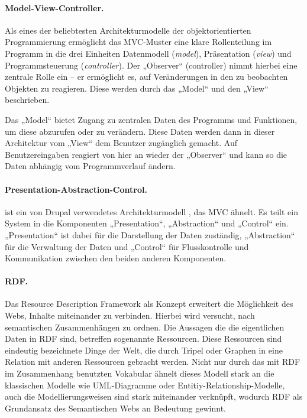 \documentclass[a4paper,11pt,twoside]{article}
\begin{document}
\paragraph{Model-View-Controller.} 
Als eines der beliebtesten Architekturmodelle der objektorientierten
Programmierung ermöglicht das MVC-Muster \cite{MVC} eine klare Rollenteilung
im Programm in die drei Einheiten Datenmodell (\textit{model}), Präsentation
(\textit{view}) und Programmsteuerung (\textit{controller}). Der „Observer“
(controller) nimmt hierbei eine zentrale Rolle ein -- er ermöglicht es, auf
Veränderungen in den zu beobachten Objekten zu reagieren. Diese werden durch
das „Model“ und den „View“ beschrieben.

Das „Model“ bietet Zugang zu zentralen Daten des Programms und Funktionen, um
diese abzurufen oder zu verändern. Diese Daten werden dann in dieser
Architektur vom „View“ dem Benutzer zugänglich gemacht. Auf Benutzereingaben
reagiert von hier an wieder der „Observer“ und kann so die Daten abhängig vom
Programmverlauf ändern.

\paragraph{Presentation-Abstraction-Control.} 
ist ein von Drupal verwendetes Architekturmodell \cite{PAC}, das MVC ähnelt.
Es teilt ein System in die Komponenten „Presentation“, „Abstraction“ und
„Control“ ein.  „Presentation“ ist dabei für die Darstellung der Daten
zuständig, „Abstraction“ für die Verwaltung der Daten und „Control“ für
Flusskontrolle und Kommunikation zwischen den beiden anderen Komponenten.

\paragraph{RDF.}	
Das Resource Description Framework \cite{RDF} als Konzept erweitert die
Möglichkeit des Webs, Inhalte miteinander zu verbinden. Hierbei wird versucht,
nach semantischen Zusammenhängen zu ordnen. Die Aussagen die die eigentlichen
Daten in RDF sind, betreffen sogenannte Ressourcen. Diese Ressourcen sind
eindeutig bezeichnete Dinge der Welt, die durch Tripel oder Graphen in eine
Relation mit anderen Ressourcen gebracht werden. Nicht nur durch das mit RDF
im Zusammenhang benutzten Vokabular ähnelt dieses Modell stark an die
klassischen Modelle wie UML-Diagramme oder Entitiy-Relationship-Modelle, auch
die Modellierungsweisen sind stark miteinander verknüpft, wodurch RDF als
Grundansatz des Semantischen Webs an Bedeutung gewinnt.
\end{document}
